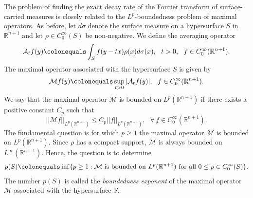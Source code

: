 \documentclass[a4paper, 11pt]{article}
\theoremstyle{plain}
\theoremstyle{definition}
\theoremstyle{lemma}
\theoremstyle{Remark}
\theoremstyle{proposition}
\theoremstyle{corollary}
\theoremstyle{example}
\theoremstyle{assumption}
\begin{document}
 The problem of finding the exact decay rate of the Fourier transform of surface-carried measures is closely related to the $L^p$-boundedness problem of maximal operators.   As before, let $d\sigma$ denote the surface measure on a hypersurface $S$ in $\mathbb{R}^{n+1}$ and let $ \rho \in C_0^{\infty}(S)$ be non-negative.  We define the averaging operator
 \begin{equation*}
 \mathcal{A}_tf(y)\colonequals \int_Sf(y-tx)\rho(x)d\sigma(x),\,\,\,\,t>0,\,\,\,\,f\in C^{\infty}_0(\mathbb{R}^{n+1}) .
 \end{equation*}
 The  maximal operator associated with the hypersurface $S$ is given by
 \begin{equation*}
 \mathcal{M}f(y)\colonequals \sup_{t>0}|\mathcal{A}_tf(y)|, \,\,\,\,f\in C^{\infty}_0(\mathbb{R}^{n+1}) .
 \end{equation*}
 We say that the maximal operator $\mathcal{M}$ is bounded on $L^p(\mathbb{R}^{n+1})$ if there exists a positive constant $C_p$ such that
 \begin{equation*}
 ||\mathcal{M}f||_{L^p(\mathbb{R}^{n+1})}\leq C_p||f||_{L^p(\mathbb{R}^{n+1})},\,\,\,\,\forall\,f\in C^{\infty}_0(\mathbb{R}^{n+1}).
 \end{equation*}
 The fundamental question is for which $p\geq 1$ the maximal operator $\mathcal{M}$ is bounded on $L^p(\mathbb{R}^{n+1})$.
 Since $\rho$ has a compact support,  $\mathcal{M}$ is always bounded on $L^{\infty}(\mathbb{R}^{n+1})$. Hence, the question is to determine %
 \begin{equation*}
 p(S)\colonequals \inf\{p\geq 1:
 \mathcal{M}\,\,\text{is bounded on}\,\,L^p(\mathbb{R}^{n+1}) \text{ for all } 0\leq \rho\in C_0^\infty(S)\}.
 \end{equation*}
The number $p(S)$ is called  the \emph{boundedness exponent} of the maximal operator $\mathcal{M}$ associated with the hypersurface $S$.
\end{document}
